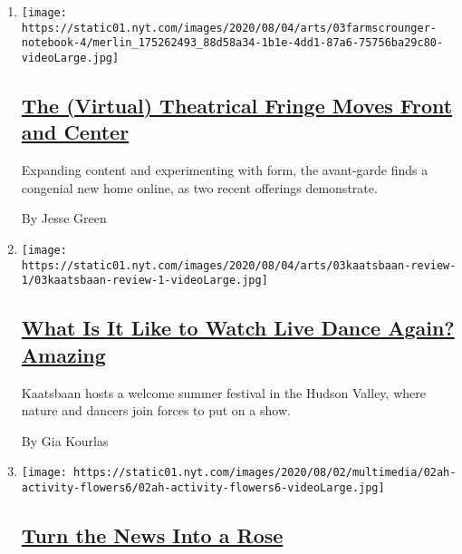 \begin{enumerate}
\def\labelenumi{\arabic{enumi}.}
\item
  \texttt{[image: https://static01.nyt.com/images/2020/08/04/arts/03farmscrounger-notebook-4/merlin\_175262493\_88d58a34-1b1e-4dd1-87a6-75756ba29c80-videoLarge.jpg]}

  \hypertarget{the-virtual-theatrical-fringe-moves-front-and-center}{%
  \subsection{\texorpdfstring{\href{/2020/08/03/theater/virtual-theater.html}{The
  (Virtual) Theatrical Fringe Moves Front and
  Center}}{The (Virtual) Theatrical Fringe Moves Front and Center}}\label{the-virtual-theatrical-fringe-moves-front-and-center}}

  Expanding content and experimenting with form, the avant-garde finds a
  congenial new home online, as two recent offerings demonstrate.

  By Jesse Green
\item
  \texttt{[image: https://static01.nyt.com/images/2020/08/04/arts/03kaatsbaan-review-1/03kaatsbaan-review-1-videoLarge.jpg]}

  \hypertarget{what-is-it-like-to-watch-live-dance-again-amazing}{%
  \subsection{\texorpdfstring{\href{/2020/08/03/arts/dance/kaatsbaan-dance.html}{What
  Is It Like to Watch Live Dance Again?
  Amazing}}{What Is It Like to Watch Live Dance Again? Amazing}}\label{what-is-it-like-to-watch-live-dance-again-amazing}}

  Kaatsbaan hosts a welcome summer festival in the Hudson Valley, where
  nature and dancers join forces to put on a show.

  By Gia Kourlas
\item
  \texttt{[image: https://static01.nyt.com/images/2020/08/02/multimedia/02ah-activity-flowers6/02ah-activity-flowers6-videoLarge.jpg]}

  \hypertarget{turn-the-news-into-a-rose}{%
  \subsection{\texorpdfstring{\href{/2020/08/01/at-home/coronavirus-paper-flowers.html}{Turn
  the News Into a
  Rose}}{Turn the News Into a Rose}}\label{turn-the-news-into-a-rose}}


\end{enumerate}
